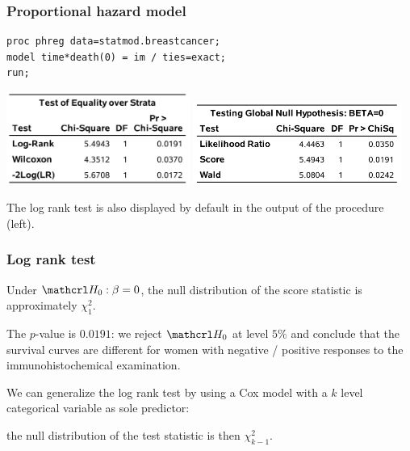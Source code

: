 \documentclass{beamer}
\begin{document}
\begin{frame}[fragile]
\frametitle{Proportional hazard model}
\begin{tcolorbox}[colback=white,colframe=hecblue, title=\SASlang{} code to fit a proportional hazard model]
\begin{verbatim}
proc phreg data=statmod.breastcancer;
model time*death(0) = im / ties=exact;
run;
\end{verbatim}
\end{tcolorbox}
\begin{center}
\includegraphics[width = 0.45\textwidth]{img/c7/slides7e16}
\includegraphics[width = 0.51\textwidth]{img/c7/slides7e17}
\end{center}
{\footnotesize 

The log rank test is also displayed by default in the \SASlang{} output of the  procedure (left).

}
\end{frame}

\begin{frame}
\frametitle{Log rank test}
\bi 
\item Under $\Hy_0: \beta=0$, the null distribution of the score statistic is approximately $\chi^2_1$.
\item The $p$-value is $0.0191$: we reject $\Hy_0$ at level $5\%$ and conclude that the survival curves are different for women with negative / positive responses to the immunohistochemical examination.
\item We can generalize the log rank test by using a Cox model with a $k$ level categorical variable as sole predictor: 
\bi \item the null distribution of the test statistic is then $\chi^2_{k-1}$.
\ei
\ei 
\end{frame}
\end{document}
